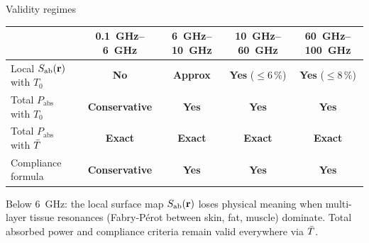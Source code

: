 \begin{frame}[label=app-p2-validity]{Validity regimes}

  \begin{center}
  {\small
  \begin{tabular}{lcccc}
    \toprule
    & \SI{0.1}{\giga\hertz}--\SI{6}{\giga\hertz}
    & \SI{6}{\giga\hertz}--\SI{10}{\giga\hertz}
    & \SI{10}{\giga\hertz}--\SI{60}{\giga\hertz}
    & \SI{60}{\giga\hertz}--\SI{100}{\giga\hertz} \\
    \midrule
    Local $S_{\mathrm{ab}}(\mathbf{r})$ with $T_0$
    & {\color{alertred}\textbf{No}}
    & {\color{orange}\textbf{Approx}}
    & {\color{resultgreen}\textbf{Yes}} ($\le 6\,\%$)
    & {\color{resultgreen}\textbf{Yes}} ($\le 8\,\%$) \\[4pt]
    Total $P_{\mathrm{abs}}$ with $T_0$
    & {\color{orange}\textbf{Conservative}}
    & {\color{resultgreen}\textbf{Yes}}
    & {\color{resultgreen}\textbf{Yes}}
    & {\color{resultgreen}\textbf{Yes}} \\[4pt]
    Total $P_{\mathrm{abs}}$ with $\bar{T}$
    & {\color{resultgreen}\textbf{Exact}}
    & {\color{resultgreen}\textbf{Exact}}
    & {\color{resultgreen}\textbf{Exact}}
    & {\color{resultgreen}\textbf{Exact}} \\[4pt]
    Compliance formula
    & {\color{resultgreen}\textbf{Conservative}}
    & {\color{resultgreen}\textbf{Yes}}
    & {\color{resultgreen}\textbf{Yes}}
    & {\color{resultgreen}\textbf{Yes}} \\
    \bottomrule
  \end{tabular}
  }
  \end{center}

  \vspace{6pt}
  {\footnotesize
    Below \SI{6}{\giga\hertz}: the local surface map $S_{\mathrm{ab}}(\mathbf{r})$ loses physical meaning when
    multi-layer tissue resonances (Fabry-P\'erot between skin, fat, muscle) dominate.
    Total absorbed power and compliance criteria remain valid everywhere via $\bar{T}$.
  }

  \vspace{4pt}
\end{frame}
